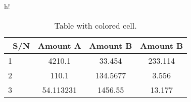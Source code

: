 \documentclass{article}
\begin{document}
	\begin{table}{h!}
		\begin{center}
			\caption{Table with colored cell.}
			\label{tab:table1}
				\begin{tabular}{l|S|c|c|} %
				\hline\
				\textbf{S/N} & \textbf{Amount A} & \textbf{Amount B} & \textbf{Amount B}\\
				\hline
				1 & 4210.1 & 33.454 & 233.114\\
				2 & 110.1 & 134.5677 & 3.556\\
				3 & 54.113231 & 1456.55 & 13.177\\
				\hline
			\end{tabular}
		\end{center}
	\end{table}
\end{document}
